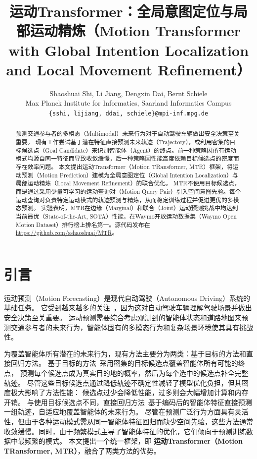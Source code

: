 \documentclass{article}
\title{运动Transformer：全局意图定位与局部运动精炼（Motion Transformer with Global Intention Localization and Local Movement Refinement）}
\author{
	Shaoshuai Shi,\quad
	Li Jiang,\quad
	Dengxin Dai,\quad
	Bernt Schiele\\
Max Planck Institute for Informatics, Saarland Informatics Campus\\
	\texttt{\{sshi, lijiang, ddai, schiele\}@mpi-inf.mpg.de} \\
}
\begin{document}
	\maketitle
	\begin{abstract}
    	预测交通参与者的多模态（Multimodal）未来行为对于自动驾驶车辆做出安全决策至关重要。 现有工作尝试基于潜在特征直接预测未来轨迹（Trajectory），或利用密集的目标候选点（Goal Candidate）来识别智能体（Agent）的终点。前一种策略因所有运动模式均源自同一特征而导致收敛缓慢，后一种策略因性能高度依赖目标候选点的密度而存在效率问题。 本文提出运动Transformer（Motion TRansformer, MTR）框架，将运动预测（Motion Prediction）建模为全局意图定位（Global Intention Localization）与局部运动精炼（Local Movement Refinement）的联合优化。 MTR不使用目标候选点，而是通过采用少量可学习的运动查询对（Motion Query Pair）引入空间意图先验。每个运动查询对负责特定运动模式的轨迹预测与精炼，从而稳定训练过程并促进更优的多模态预测。 实验表明，MTR在边缘（Marginal）和联合（Joint）运动预测挑战中均达到当前最优（State-of-the-Art, SOTA）性能，在Waymo开放运动数据集（Waymo Open Motion Dataset）排行榜上排名第一。源代码发布在 \url{https://github.com/sshaoshuai/MTR}。
	\end{abstract}
	
	\section{引言}
	运动预测（Motion Forecasting）是现代自动驾驶（Autonomous Driving）系统的基础任务。
	它受到越来越多的关注~\cite{gu2021densetnt,tolstaya2021identifying,liu2021multimodal,ye2021tpcn,ngiam2021scene}，因为这对自动驾驶车辆理解驾驶场景并做出安全决策至关重要。
	运动预测需要综合考虑观测到的智能体状态和道路地图来预测交通参与者的未来行为，智能体固有的多模态行为和复杂场景环境使其具有挑战性。
	
	为覆盖智能体所有潜在的未来行为，现有方法主要分为两类：基于目标的方法和直接回归方法。
			基于目标的方法~\cite{gu2021densetnt,zhao2020tnt}采用密集的目标候选点覆盖智能体所有可能的终点，
	预测每个候选点成为真实目的地的概率，然后为每个选中的候选点补全完整轨迹。
	尽管这些目标候选点通过降低轨迹不确定性减轻了模型优化负担，但其密度极大影响了方法性能：
			候选点过少会降低性能，过多则会大幅增加计算和内存开销。
	与使用目标候选点不同，直接回归方法~\cite{ngiam2021scene,varadarajan2021multipath++}基于编码后的智能体特征直接预测一组轨迹，自适应地覆盖智能体的未来行为。
	尽管在预测广泛行为方面具有灵活性，但由于各种运动模式需从同一智能体特征回归而缺少空间先验，这些方法通常收敛缓慢。同时，由于频繁模式主导了智能体特征的优化，它们倾向于预测训练数据中最频繁的模式。
    本文提出一个统一框架，即 \textbf{运动Transformer（Motion TRansformer, MTR）}，融合了两类方法的优势。
\end{document}
